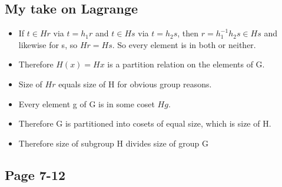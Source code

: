\documentclass[11pt, oneside]{article}   	%
\begin{document}
\subsection {My take on Lagrange}

\begin{itemize}
\item If $t \in Hr$ via $t = h_1r$ and $t \in Hs$ via $t=h_2s$, then $r = h_1^{-1}h_2s \in Hs$ and likewise for s, so $Hr = Hs$.  So every element is in both or neither.
\item Therefore $H(x) = Hx$ is a partition relation on the elements of G.
\item Size of $Hr$ equals size of H for obvious group reasons.
\item Every element g of G is in some coset $Hg$.  
\item Therefore G is partitioned into cosets of equal size, which is size of H.
\item Therefore size of subgroup H divides size of group G
\end{itemize}

\begin{comment}

* Cosets form equivalence classes
** Hr and Hs share either one element (identity) or all elements.
*** Suppose t in Hr and Hs, and t is not identity.
*** Then t = h_1*r = h_2 * s
*** Suppose r, s in H.  Then equal.
*** Suppose 
* Cosets are the same size
* Size of cosets divide group size
* Therefore size of He = H divides group size
\end{comment}

\subsection {Page 7-12}
\end{document}
